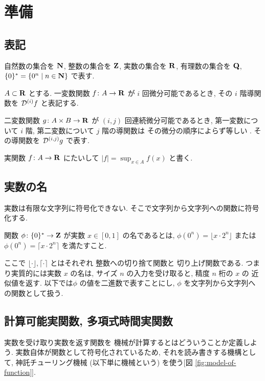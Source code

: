 \section{準備}
\label{section: preliminaries}

\subsection{表記}
自然数の集合を $\mathbf N$, 整数の集合を $\mathbf Z$, 実数の集合を $\mathbf R$, 
有理数の集合を $\mathbf Q$, $\{0\}^* = \{0^n \mid n \in \mathbf N\}$ で表す. 

$A \subset \mathbf R$ とする. 一変数関数 $f\colon A \to \mathbf R$ が $i$ 回微分可能であるとき,
その $i$ 階導関数を $\mathcal D^{(i)}f$ と表記する.

二変数関数 $g \colon A \times B \to \mathbf R$ が
$(i, j)$ 回連続微分可能であるとき,
第一変数について $i$ 階, 第二変数について $j$ 階の導関数は
その微分の順序によらず等しい \cite{takagi1968analysis}.
その導関数を $\mathcal D^{(i,j)}g$ で表す.

実関数 $f \colon A \to \mathbf R$ にたいして $|f| = \sup_{x \in A} f(x)$ と書く.

\subsection{実数の名}
 実数は有限な文字列に符号化できない. 
 そこで文字列から文字列への関数に符号化する.
 \begin{definition}[実数の名]
  関数 $\phi \colon \{0\}^* \to \mathbf Z $ が実数 $x \in [0,1]$ の名であるとは,
  $\phi(0^n) = \lfloor x \cdot 2^n \rfloor$ または
  $\phi(0^n) = \lceil x \cdot 2^n \rceil$ を満たすこと.
 \end{definition}
ここで $\lfloor \cdot \rfloor, \lceil \cdot \rceil$ とはそれぞれ
整数への切り捨て関数と
切り上げ関数である.
つまり実質的には実数 $x$ の名は, 
サイズ $n$ の入力を受け取ると, 精度 $n$ 桁の $x$ の
近似値を返す.
以下では$\phi$ の値を二進数で表すことにし, 
$\phi$ を文字列から文字列への関数として扱う. 

\subsection{計算可能実関数, 多項式時間実関数}

実数を受け取り実数を返す関数を
機械が計算するとはどういうことか定義しよう. 
実数自体が関数として符号化されているため, 
それを読み書きする機構として, 
神託チューリング機械 (以下単に機械という) を使う[図 \ref{fig:model-of-function}].

